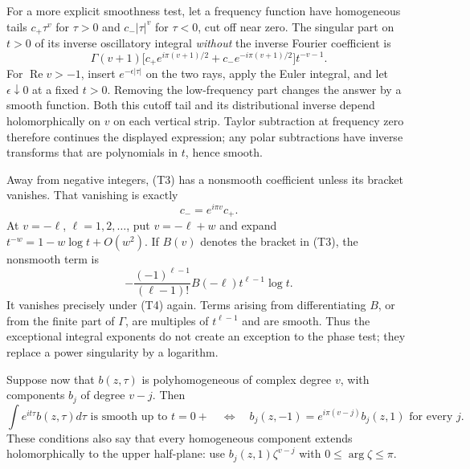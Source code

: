 \documentclass[
  11pt,
]{article}
\begin{document}
For a more explicit smoothness test, let a frequency function have
homogeneous tails \(c_+\tau^v\) for \(\tau>0\) and \(c_-|\tau|^v\) for
\(\tau<0\), cut off near zero. The singular part on \(t>0\) of its
inverse oscillatory integral \emph{without} the inverse Fourier
coefficient is \[
\Gamma(v+1)
\big[c_+e^{i\pi(v+1)/2}+c_-e^{-i\pi(v+1)/2}\big]
t^{-v-1}.
\tag{T3}
\] For \(\operatorname{Re}v>-1\), insert \(e^{-\epsilon|\tau|}\) on the
two rays, apply the Euler integral, and let \(\epsilon\downarrow0\) at a
fixed \(t>0\). Removing the low-frequency part changes the answer by a
smooth function. Both this cutoff tail and its distributional inverse
depend holomorphically on \(v\) on each vertical strip. Taylor
subtraction at frequency zero therefore continues the displayed
expression; any polar subtractions have inverse transforms that are
polynomials in \(t\), hence smooth.

Away from negative integers, (T3) has a nonsmooth coefficient unless its
bracket vanishes. That vanishing is exactly \[
c_-=e^{i\pi v}c_+.
\tag{T4}
\] At \(v=-\ell\), \(\ell=1,2,\ldots\), put \(v=-\ell+w\) and expand
\(t^{-w}=1-w\log t+O(w^2)\). If \(B(v)\) denotes the bracket in (T3),
the nonsmooth term is \[
-\frac{(-1)^{\ell-1}}{(\ell-1)!}
B(-\ell)t^{\ell-1}\log t.
\tag{T5}
\] It vanishes precisely under (T4) again. Terms arising from
differentiating \(B\), or from the finite part of \(\Gamma\), are
multiples of \(t^{\ell-1}\) and are smooth. Thus the exceptional
integral exponents do not create an exception to the phase test; they
replace a power singularity by a logarithm.

Suppose now that \(b(z,\tau)\) is polyhomogeneous of complex degree
\(v\), with components \(b_j\) of degree \(v-j\). Then \[
\int e^{it\tau}b(z,\tau)d\tau\text{ is smooth up to }t=0+
\quad\Longleftrightarrow\quad
b_j(z,-1)=e^{i\pi(v-j)}b_j(z,1)
\text{ for every }j.
\tag{T6}
\] These conditions also say that every homogeneous component extends
holomorphically to the upper half-plane: use \(b_j(z,1)\zeta^{v-j}\)
with \(0\leq\arg\zeta\leq\pi\).
\end{document}

